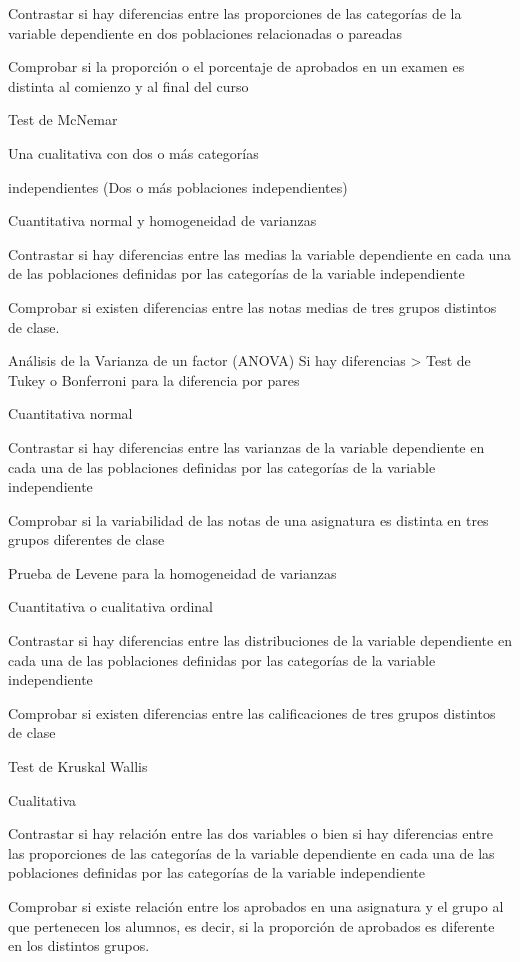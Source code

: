 \documentclass[
  a4paper,
]{scrreport}
\theoremstyle{definition}
\theoremstyle{definition}
\theoremstyle{remark}
\begin{document}
Contrastar si hay diferencias entre las proporciones de las categorías
de la variable dependiente en dos poblaciones relacionadas o pareadas

Comprobar si la proporción o el porcentaje de aprobados en un examen es
distinta al comienzo y al final del curso

Test de McNemar

Una cualitativa con dos o más categorías

independientes (Dos o más poblaciones independientes)

Cuantitativa normal y homogeneidad de varianzas

Contrastar si hay diferencias entre las medias la variable dependiente
en cada una de las poblaciones definidas por las categorías de la
variable independiente

Comprobar si existen diferencias entre las notas medias de tres grupos
distintos de clase.

Análisis de la Varianza de un factor (ANOVA) Si hay diferencias
\textgreater{} Test de Tukey o Bonferroni para la diferencia por pares

Cuantitativa normal

Contrastar si hay diferencias entre las varianzas de la variable
dependiente en cada una de las poblaciones definidas por las categorías
de la variable independiente

Comprobar si la variabilidad de las notas de una asignatura es distinta
en tres grupos diferentes de clase

Prueba de Levene para la homogeneidad de varianzas

Cuantitativa o cualitativa ordinal

Contrastar si hay diferencias entre las distribuciones de la variable
dependiente en cada una de las poblaciones definidas por las categorías
de la variable independiente

Comprobar si existen diferencias entre las calificaciones de tres grupos
distintos de clase

Test de Kruskal Wallis

Cualitativa

Contrastar si hay relación entre las dos variables o bien si hay
diferencias entre las proporciones de las categorías de la variable
dependiente en cada una de las poblaciones definidas por las categorías
de la variable independiente

Comprobar si existe relación entre los aprobados en una asignatura y el
grupo al que pertenecen los alumnos, es decir, si la proporción de
aprobados es diferente en los distintos grupos.
\end{document}
